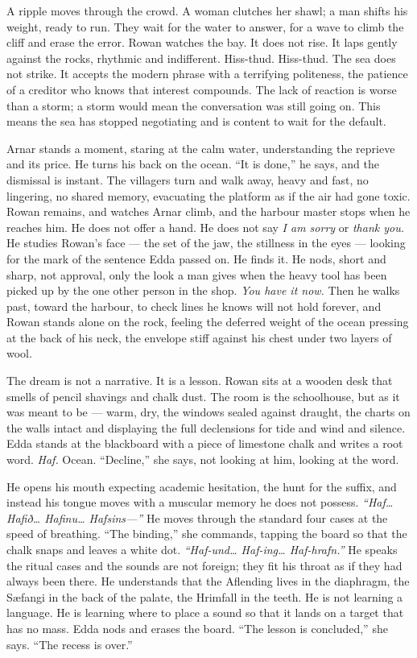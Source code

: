 \documentclass[11pt,oneside]{book}
\newcommand{\sceneline}{%
  \par\vspace{1.2em}
  \begin{center}
    \fontsize{11}{11}\selectfont \textbullet\quad\textbullet\quad\textbullet
  \end{center}
  \vspace{0.6em}\noindent\ignorespaces
}
\begin{document}
A ripple moves through the crowd. A woman clutches her shawl; a man
shifts his weight, ready to run. They wait for the water to answer, for
a wave to climb the cliff and erase the error. Rowan watches the bay. It
does not rise. It laps gently against the rocks, rhythmic and
indifferent. Hiss-thud. Hiss-thud. The sea does not strike. It accepts
the modern phrase with a terrifying politeness, the patience of a
creditor who knows that interest compounds. The lack of reaction is
worse than a storm; a storm would mean the conversation was still going
on. This means the sea has stopped negotiating and is content to wait
for the default.

Arnar stands a moment, staring at the calm water, understanding the
reprieve and its price. He turns his back on the ocean. ``It is done,''
he says, and the dismissal is instant. The villagers turn and walk away,
heavy and fast, no lingering, no shared memory, evacuating the platform
as if the air had gone toxic. Rowan remains, and watches Arnar climb,
and the harbour master stops when he reaches him. He does not offer a
hand. He does not say \emph{I am sorry} or \emph{thank you.} He studies
Rowan's face --- the set of the jaw, the stillness in the eyes ---
looking for the mark of the sentence Edda passed on. He finds it. He
nods, short and sharp, not approval, only the look a man gives when the
heavy tool has been picked up by the one other person in the shop.
\emph{You have it now.} Then he walks past, toward the harbour, to check
lines he knows will not hold forever, and Rowan stands alone on the
rock, feeling the deferred weight of the ocean pressing at the back of
his neck, the envelope stiff against his chest under two layers of wool.

\sceneline

The dream is not a narrative. It is a lesson. Rowan sits at a wooden
desk that smells of pencil shavings and chalk dust. The room is the
schoolhouse, but as it was meant to be --- warm, dry, the windows sealed
against draught, the charts on the walls intact and displaying the full
declensions for tide and wind and silence. Edda stands at the blackboard
with a piece of limestone chalk and writes a root word. \emph{Haf.}
Ocean. ``Decline,'' she says, not looking at him, looking at the word.

He opens his mouth expecting academic hesitation, the hunt for the
suffix, and instead his tongue moves with a muscular memory he does not
possess. \emph{``Haf\ldots{} Hafið\ldots{} Hafinu\ldots{} Hafsins---''}
He moves through the standard four cases at the speed of breathing.
``The binding,'' she commands, tapping the board so that the chalk snaps
and leaves a white dot. \emph{``Haf-und\ldots{} Haf-ing\ldots{}
Haf-hrafn.''} He speaks the ritual cases and the sounds are not foreign;
they fit his throat as if they had always been there. He understands
that the Aflending lives in the diaphragm, the Sæfangi in the back of
the palate, the Hrimfall in the teeth. He is not learning a language. He
is learning where to place a sound so that it lands on a target that has
no mass. Edda nods and erases the board. ``The lesson is concluded,''
she says. ``The recess is over.''
\end{document}
